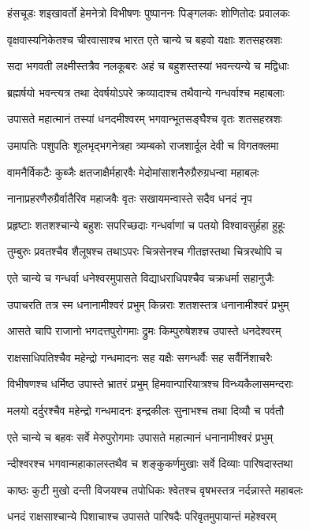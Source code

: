 \twolineshloka
{हंसचूडः शइखावर्तो हेमनेत्रो विभीषणः}
{पुष्पाननः पिङ्गलकः शोणितोदः प्रवालकः}


\twolineshloka
{वृक्षवास्यनिकेतश्च चीरवासाश्च भारत}
{एते चान्ये च बहवो यक्षाः शतसहस्रशः}


\twolineshloka
{सदा भगवती लक्ष्मीस्तत्रैव नलकूबरः}
{अहं च बहुशस्तस्यां भवन्त्यन्ये च मद्विधाः}


\twolineshloka
{ब्रह्मर्षयो भवन्त्यत्र तथा देवर्षयोऽपरे}
{क्रव्यादाश्च तथैवान्ये गन्धर्वाश्च महाबलाः}


\twolineshloka
{उपासते महात्मानं तस्यां धनदमीश्वरम्}
{भगवान्भूतसङ्घैश्च वृतः शतसहस्रशः}


\twolineshloka
{उमापतिः पशुपतिः शूलभृद्भगनेत्रहा}
{त्र्यम्बको राजशार्दूल देवी च विगतक्लमा}


\twolineshloka
{वामनैर्विकटैः कुब्जैः क्षतजाक्षैर्महारवैः}
{मेदोमांसाशनैरुग्रैरुग्रधन्वा महाबलः}


\twolineshloka
{नानाप्रहरणैरुग्रैर्वातैरिव महाजवैः}
{वृतः सखायमन्वास्ते सदैव धनदं नृप}


\twolineshloka
{प्रहृष्टाः शतशश्चान्ये बहुशः सपरिच्छदाः}
{गन्धर्वाणां च पतयो विश्वावसुर्हहा हुहूः}


\twolineshloka
{तुम्बुरुः प्रवतश्चैव शैलूषश्च तथाऽपरः}
{चित्रसेनश्च गीतज्ञस्तथा चित्ररथोपि च}


\twolineshloka
{एते चान्ये च गन्धर्वा धनेश्वरमुपासते}
{विद्याधराधिपश्चैव चक्रधर्मा सहानुजैः}


\twolineshloka
{उपाचरति तत्र स्म धनानामीश्वरं प्रभुम्}
{किन्नराः शतशस्तत्र धनानामीश्वरं प्रभुम्}


\twolineshloka
{आसते चापि राजानो भगदत्तपुरोगमाः}
{द्रुमः किम्पुरुषेशश्च उपास्ते धनदेश्वरम्}


\twolineshloka
{राक्षसाधिपतिश्चैव महेन्द्रो गन्धमादनः}
{सह यक्षैः सगन्धर्वैः सह सर्वैर्निशाचरैः}


\twolineshloka
{विभीषणश्च धर्मिष्ठ उपास्ते भ्रातरं प्रभुम्}
{हिमवान्पारियात्रश्च विन्ध्यकैलासमन्दराः}


\twolineshloka
{मलयो दर्दुरश्चैव महेन्द्रो गन्धमादनः}
{इन्द्रकीलः सुनाभश्च तथा दिव्यौ च पर्वतौ}


\twolineshloka
{एते चान्ये च बहवः सर्वे मेरुपुरोगमाः}
{उपासते महात्मानं धनानामीश्वरं प्रभुम्}


\twolineshloka
{न्दीश्वरश्च भगवान्महाकालस्तथैव च}
{शङ्कुकर्णमुखाः सर्वे दिव्याः पारिषदास्तथा}


\twolineshloka
{काष्ठः कुटी मुखो दन्ती विजयश्च तपोधिकः}
{श्वेतश्च वृषभस्तत्र नर्दन्नास्ते महाबलः}


\twolineshloka
{धनदं राक्षसाश्चान्ये पिशाचाश्च उपासते}
{पारिषदैः परिवृतमुपायान्तं महेश्वरम्}


